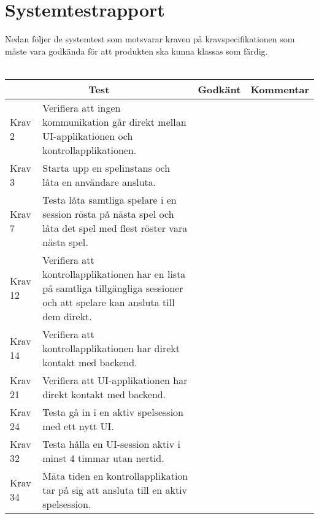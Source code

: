 \documentclass[10pt]{article}
\begin{document}
\section{Systemtestrapport}
Nedan följer de systemtest som motsvarar kraven på kravspecifikationen \cite{bib-kravspecifikation} som måste vara godkända för att produkten ska kunna klassas som färdig.
\\ \\
\noindent
	\begin{tabular}{| p{1.5cm} | p{5cm} | p{1.2cm}| p{7cm}|}
	
  \hline
    \multicolumn{2}{|c|}{Test}&{Godkänt}&{Kommentar}\\
    \hline
		Krav 2&Verifiera att ingen kommunikation går direkt mellan UI-applikationen och kontrollapplikationen.&&\\
		\hline
		Krav 3&Starta upp en spelinstans och låta en användare ansluta.&& \\
		\hline
		Krav 7& Testa låta samtliga spelare i en session rösta på nästa spel och låta det spel med flest röster vara nästa spel.&&\\
		\hline
		Krav 12& Verifiera att kontrollapplikationen har en lista på samtliga tillgängliga sessioner och att spelare kan ansluta till dem direkt.&& \\
		\hline
		Krav 14& Verifiera att kontrollapplikationen har direkt kontakt med backend.&& \\
		\hline
		Krav 21& Verifiera att UI-applikationen har direkt kontakt med backend.&& \\
		\hline
		Krav 24& Testa gå in i en aktiv spelsession med ett nytt UI.&& \\
		\hline
		Krav 32& Testa hålla en UI-session aktiv i minst 4 timmar utan nertid.&& \\
		\hline
		Krav 34& Mäta tiden en kontrollapplikation tar på sig att ansluta till en aktiv spelsession.&& \\
		\hline

   
  \end{tabular}
  
\end{document}
